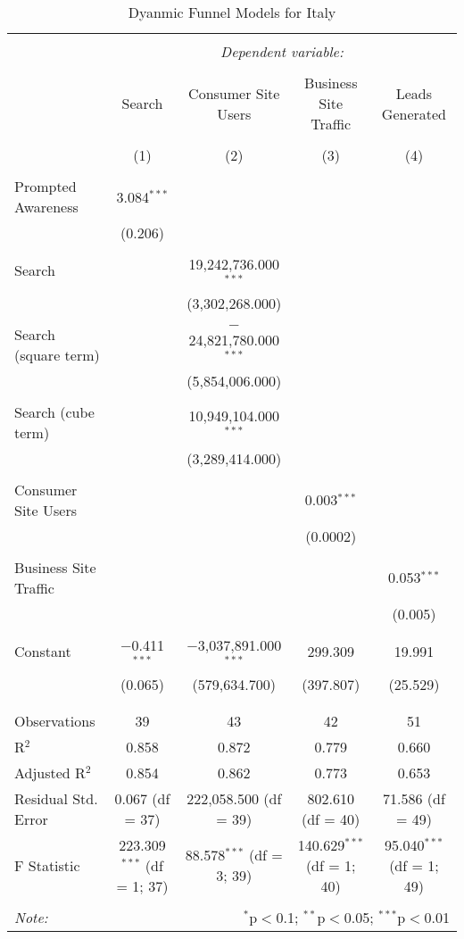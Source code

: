 \documentclass[
  landscape]{article}
\begin{document}
\begin{table}[!htbp] \centering 
  \caption{Dyanmic Funnel Models for Italy} 
  \label{} 
\begin{tabular}{@{\extracolsep{5pt}}lcccc} 
\\[-1.8ex]\hline 
\hline \\[-1.8ex] 
 & \multicolumn{4}{c}{\textit{Dependent variable:}} \\ 
\cline{2-5} 
\\[-1.8ex] & Search & Consumer Site Users & Business Site Traffic & Leads Generated \\ 
\\[-1.8ex] & (1) & (2) & (3) & (4)\\ 
\hline \\[-1.8ex] 
 Prompted Awareness & 3.084$^{***}$ &  &  &  \\ 
  & (0.206) &  &  &  \\ 
  & & & & \\ 
 Search &  & 19,242,736.000$^{***}$ &  &  \\ 
  &  & (3,302,268.000) &  &  \\ 
  & & & & \\ 
 Search (square term) &  & $-$24,821,780.000$^{***}$ &  &  \\ 
  &  & (5,854,006.000) &  &  \\ 
  & & & & \\ 
 Search (cube term) &  & 10,949,104.000$^{***}$ &  &  \\ 
  &  & (3,289,414.000) &  &  \\ 
  & & & & \\ 
 Consumer Site Users &  &  & 0.003$^{***}$ &  \\ 
  &  &  & (0.0002) &  \\ 
  & & & & \\ 
 Business Site Traffic &  &  &  & 0.053$^{***}$ \\ 
  &  &  &  & (0.005) \\ 
  & & & & \\ 
 Constant & $-$0.411$^{***}$ & $-$3,037,891.000$^{***}$ & 299.309 & 19.991 \\ 
  & (0.065) & (579,634.700) & (397.807) & (25.529) \\ 
  & & & & \\ 
\hline \\[-1.8ex] 
Observations & 39 & 43 & 42 & 51 \\ 
R$^{2}$ & 0.858 & 0.872 & 0.779 & 0.660 \\ 
Adjusted R$^{2}$ & 0.854 & 0.862 & 0.773 & 0.653 \\ 
Residual Std. Error & 0.067 (df = 37) & 222,058.500 (df = 39) & 802.610 (df = 40) & 71.586 (df = 49) \\ 
F Statistic & 223.309$^{***}$ (df = 1; 37) & 88.578$^{***}$ (df = 3; 39) & 140.629$^{***}$ (df = 1; 40) & 95.040$^{***}$ (df = 1; 49) \\ 
\hline 
\hline \\[-1.8ex] 
\textit{Note:}  & \multicolumn{4}{r}{$^{*}$p$<$0.1; $^{**}$p$<$0.05; $^{***}$p$<$0.01} \\ 
\end{tabular} 
\end{table}
\end{document}
